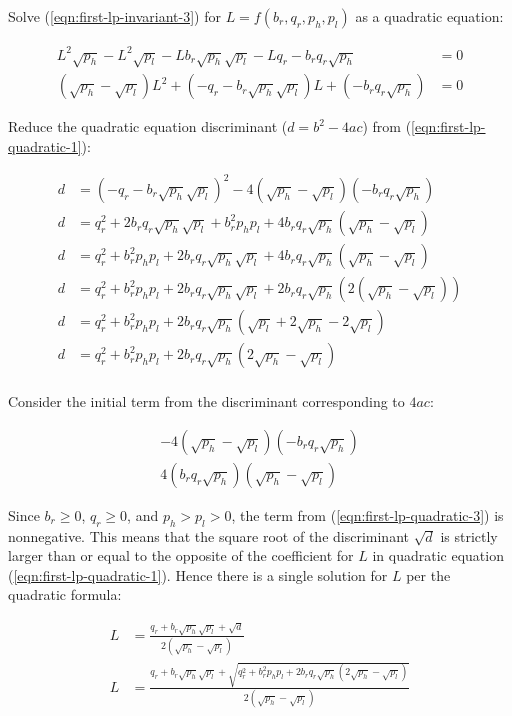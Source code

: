 \documentclass[table, twocolumn]{article}
\begin{document}
Solve (\ref{eqn:first-lp-invariant-3}) for $L = f(b_r, q_r, p_h, p_l)$ as a quadratic
equation:

\begin{align} \label{eqn:first-lp-quadratic-1}
  L^2 \sqrt{p_h} - L^2 \sqrt{p_l} - L b_r \sqrt{p_h} \sqrt{p_l} - L q_r
  - b_r q_r \sqrt{p_h}  & = 0 \nonumber \\
  (\sqrt{p_h} - \sqrt{p_l}) L^2 + (-q_r -b_r \sqrt{p_h} \sqrt{p_l}) L +
  (-b_r q_r \sqrt{p_h}) & = 0
\end{align}

Reduce the quadratic equation discriminant ($d = b^2 - 4ac$) from
(\ref{eqn:first-lp-quadratic-1}):

\begin{align} \label{eqn:first-lp-quadratic-2}
  d & = (-q_r - b_r \sqrt{p_h} \sqrt{p_l})^2
  - 4(\sqrt{p_h} - \sqrt{p_l})(-b_r q_r \sqrt{p_h}) \nonumber    \\
  d & = q_r^2 + 2 b_r q_r \sqrt{p_h} \sqrt{p_l} + b_r^2 p_h p_l
  + 4 b_r q_r \sqrt{p_h} (\sqrt{p_h} - \sqrt{p_l}) \nonumber     \\
  d & = q_r^2 + b_r^2 p_h p_l + 2 b_r q_r \sqrt{p_h} \sqrt{p_l}
  + 4 b_r q_r \sqrt{p_h} (\sqrt{p_h} - \sqrt{p_l}) \nonumber     \\
  d & = q_r^2 + b_r^2 p_h p_l + 2 b_r q_r \sqrt{p_h} \sqrt{p_l}
  + 2 b_r q_r \sqrt{p_h} (2 (\sqrt{p_h} - \sqrt{p_l})) \nonumber \\
  d & = q_r^2 + b_r^2 p_h p_l + 2 b_r q_r \sqrt{p_h}
  (\sqrt{p_l} + 2 \sqrt{p_h} - 2 \sqrt{p_l}) \nonumber           \\
  d & = q_r^2 + b_r^2 p_h p_l + 2 b_r q_r \sqrt{p_h}
  (2 \sqrt{p_h} - \sqrt{p_l}) \nonumber                          \\
\end{align}

Consider the initial term from the discriminant corresponding to $4ac$:

\begin{align} \label{eqn:first-lp-quadratic-3}
  - 4(\sqrt{p_h} - \sqrt{p_l})(-b_r q_r \sqrt{p_h}) \nonumber \\
  4(b_r q_r \sqrt{p_h})(\sqrt{p_h} - \sqrt{p_l})
\end{align}

Since $b_r \geq 0$, $q_r \geq 0$, and $p_h > p_l > 0$, the term from
(\ref{eqn:first-lp-quadratic-3}) is nonnegative. This means that the square root of the
discriminant $\sqrt{d}$ is strictly larger than or equal to the opposite of the
coefficient for $L$ in quadratic equation (\ref{eqn:first-lp-quadratic-1}). Hence there
is a single solution for $L$ per the quadratic formula:

\begin{align}
  L & = \frac{q_r + b_r \sqrt{p_h} \sqrt{p_l} + \sqrt{d}}
  {2(\sqrt{p_h} - \sqrt{p_l})} \nonumber                  \\
  L & = \frac{q_r + b_r \sqrt{p_h} \sqrt{p_l} + \sqrt{
      q_r^2 + b_r^2 p_h p_l + 2 b_r q_r \sqrt{p_h} (2 \sqrt{p_h} - \sqrt{p_l})
    }} {2(\sqrt{p_h} - \sqrt{p_l})}
\end{align}
\end{document}
